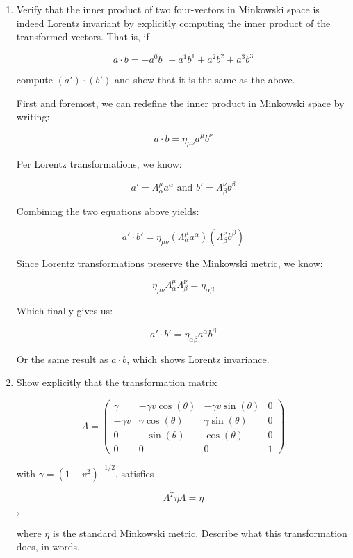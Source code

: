 \begin{enumerate}

  \item Verify that the inner product of two four-vectors in Minkowski space is indeed Lorentz invariant by explicitly computing the inner product of the transformed vectors. That is, if

    $$a\cdot b=-a^0b^0+a^1b^1+a^2b^2+a^3b^3$$

    compute $(a') \cdot (b')$ and show that it is the same as the above.

    First and foremost, we can redefine the inner product in Minkowski space by writing:

    $$a\cdot b=\eta_{\mu\nu}a^{\mu}b^{\nu}$$

    Per Lorentz transformations, we know:

    $$a'=\Lambda^{\mu}_{\alpha}a^{\alpha}\text{ and }b'=\Lambda^{\nu}_{\beta}b^{\beta}$$

    Combining the two equations above yields:

    $$a'\cdot b'=\eta_{\mu\nu}\left(  \Lambda^{\mu}_{\alpha}a^{\alpha}\right)\left(  \Lambda^{\nu}_{\beta}b^{\beta}\right)$$

    Since Lorentz transformations preserve the Minkowski metric, we know:

    $$\eta_{\mu\nu}\Lambda_{\alpha}^{\mu}\Lambda_{\beta}^{\nu}=\eta_{\alpha\beta}$$

    Which finally gives us:

    $$\boxed{a'\cdot b'=\eta_{\alpha\beta}a^{\alpha}b^{\beta}}$$

    Or the same result as $a\cdot b$, which shows Lorentz invariance.

  \item Show explicitly that the transformation matrix
    
    $$\Lambda=\left( \begin{array}{cccc} \gamma & -\gamma v\cos(\theta) & -\gamma v\sin(\theta) & 0\\ -\gamma v& \gamma \cos(\theta) & \gamma\sin(\theta) & 0\\ 0 & -\sin(\theta) & \cos(\theta) & 0\\ 0 & 0 & 0 & 1\end{array} \right)$$

    with $\gamma = (1 -v^2)^{−1/2}$, satisfies

    $$\Lambda^T\eta\Lambda=\eta$$,

    where $\eta$ is the standard Minkowski metric. Describe what this transformation does, in words.


\end{enumerate}
